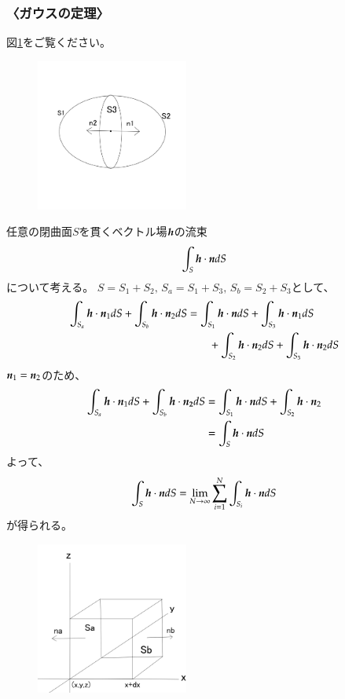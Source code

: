 \documentclass[10pt,b5paper,papersize,dvipdfmx]{jsbook}
\begin{document}
\subsubsection{〈ガウスの定理〉}
図\ref{fig:Gauss1}をご覧ください。
\begin{figure}[htbp]
  \centering
  \includegraphics[width=5cm]{img/Gauss}
  \caption{}
  \label{fig:Gauss1}
\end{figure}
任意の閉曲面$S$を貫くベクトル場$\vb*{h}$の流束
\begin{align}
  \int_S \vb*{h}\cdot\vb*{n}dS
\end{align}
について考える。
$S = S_1 + S_2,\, S_a = S_1 + S_3,\, S_b = S_2 + S_3$として、
\begin{align}
  \int_{S_a} \vb*{h}\cdot\vb*{n}_1 dS + \int_{S_b} \vb*{h}\cdot\vb*{n}_2 dS 
  &= \int_{S_1} \vb*{h}\cdot\vb*{n} dS + \int_{S_3} \vb*{h}\cdot\vb*{n}_1dS \notag\\
  &\qquad + \int_{S_2} \vb*{h}\cdot\vb*{n}_2 dS + \int_{S_3} \vb*{h}\cdot\vb*{n}_2 dS 
\end{align}
$\vb*{n}_1 = \vb*{n}_2$のため、
\begin{align}
  \int_{S_a} \vb*{h}\cdot\vb*{n}_1 dS + \int_{S_b} \vb*{h}\cdot\vb*{n_2} dS
  &= \int_{S_1} \vb*{h}\cdot\vb*{n} dS + \int_{S_2} \vb*{h}\cdot\vb*{n}_2 \notag \\
  &= \int_S \vb*{h}\cdot\vb*{n} dS
\end{align}
よって、
\begin{align}
  \int_S \vb*{h}\cdot\vb*{n} dS
  = \lim_{N \to \infty} \sum_{i=1}^N \int_{S_i} \vb*{h}\cdot\vb*{n} dS
\end{align}
が得られる。
\begin{figure}[htbp]
  \centering
  \includegraphics[width=5cm]{img/Gauss2}
  \caption{}
  \label{fig:Gauss2}
\end{figure}
\end{document}

